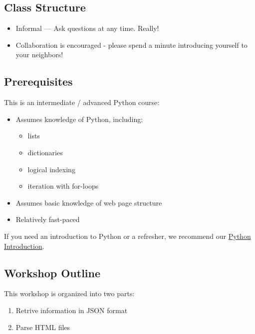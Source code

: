 \documentclass[]{book}
\providecommand{\tightlist}{%
  \setlength{\itemsep}{0pt}\setlength{\parskip}{0pt}}
\begin{document}
\subsection{Class Structure}\label{class-structure-5}

\begin{itemize}
\tightlist
\item
  Informal --- Ask questions at any time. Really!
\item
  Collaboration is encouraged - please spend a minute introducing
  yourself to your neighbors!
\end{itemize}

\subsection{Prerequisites}\label{prerequisites-5}

This is an intermediate / advanced Python course:

\begin{itemize}
\tightlist
\item
  Assumes knowledge of Python, including:

  \begin{itemize}
  \tightlist
  \item
    lists
  \item
    dictionaries
  \item
    logical indexing
  \item
    iteration with for-loops
  \end{itemize}
\item
  Assumes basic knowledge of web page structure
\item
  Relatively fast-paced
\end{itemize}

If you need an introduction to Python or a refresher, we recommend our
\href{https://iqss.github.io/dss-workshops/PythonIntro.html}{Python
Introduction}.

\subsection{Workshop Outline}\label{workshop-outline-2}

This workshop is organized into two parts:

\begin{enumerate}
\def\labelenumi{\arabic{enumi}.}
\tightlist
\item
  Retrive information in JSON format
\item
  Parse HTML files
\end{enumerate}
\end{document}
